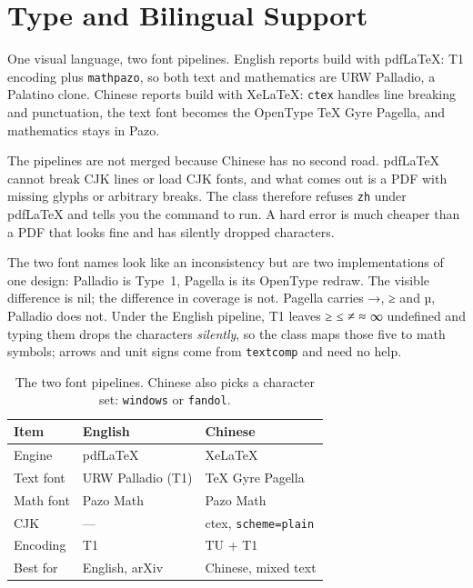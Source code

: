 \section{Type and Bilingual Support}
\label{sec:type}

One visual language, two font pipelines. English reports build with pdfLaTeX: T1
encoding plus \texttt{mathpazo}, so both text and mathematics are URW Palladio, a
Palatino clone. Chinese reports build with XeLaTeX: \texttt{ctex} handles line breaking
and punctuation, the text font becomes the OpenType TeX Gyre Pagella, and mathematics
stays in Pazo.\citep{ctex,texgyre}

The pipelines are not merged because Chinese has no second road. pdfLaTeX cannot break
CJK lines or load CJK fonts, and what comes out is a PDF with missing glyphs or arbitrary
breaks. The class therefore refuses \texttt{zh} under pdfLaTeX and tells you the command
to run. A hard error is much cheaper than a PDF that looks fine and has silently dropped
characters.

The two font names look like an inconsistency but are two implementations of one design:
Palladio is Type~1, Pagella is its OpenType redraw. The visible difference is nil; the
difference in coverage is not. Pagella carries →, ≥ and µ,
Palladio does not. Under the English pipeline, T1 leaves ≥ ≤ ≠ ≈ ∞ undefined and
typing them drops the characters \emph{silently}, so the class maps those five to math
symbols; arrows and unit signs come from \texttt{textcomp} and need no help.

\begin{table}[htbp]
  \centering
  \small
  \caption{The two font pipelines. Chinese also picks a character set: \texttt{windows} or
  \texttt{fandol}.}
  \label{tab:pipeline}
  \begin{tabular}{@{}lll@{}}
    \toprule
    Item & English & Chinese \\
    \midrule
    Engine     & pdfLaTeX           & XeLaTeX \\
    Text font  & URW Palladio (T1)  & TeX Gyre Pagella \\
    Math font  & Pazo Math          & Pazo Math \\
    CJK        & ---                & ctex, \texttt{scheme=plain} \\
    Encoding   & T1                 & TU + T1 \\
    Best for   & English, arXiv     & Chinese, mixed text \\
    \bottomrule
  \end{tabular}
\end{table}

